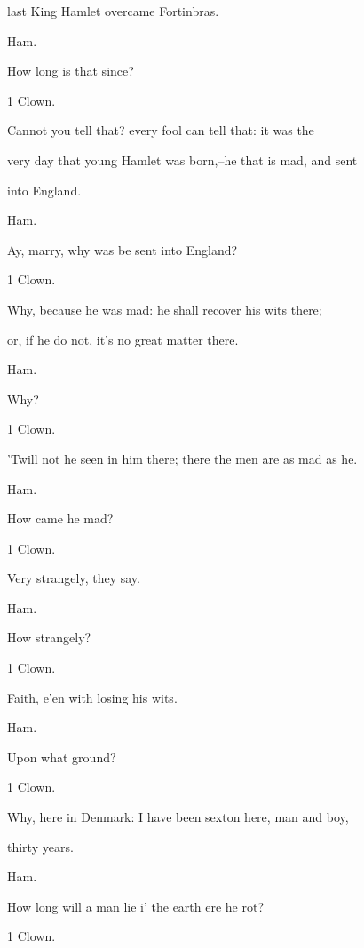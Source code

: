 \documentclass[12pt]{book}
\begin{document}
last King Hamlet overcame Fortinbras.



Ham.

How long is that since?



1 Clown.

Cannot you tell that? every fool can tell that: it was the

very day that young Hamlet was born,--he that is mad, and sent

into England.



Ham.

Ay, marry, why was be sent into England?



1 Clown.

Why, because he was mad: he shall recover his wits there;

or, if he do not, it's no great matter there.



Ham.

Why?



1 Clown.

'Twill not he seen in him there; there the men are as mad as he.



Ham.

How came he mad?



1 Clown.

Very strangely, they say.



Ham.

How strangely?



1 Clown.

Faith, e'en with losing his wits.



Ham.

Upon what ground?



1 Clown.

Why, here in Denmark: I have been sexton here, man and boy,

thirty years.



Ham.

How long will a man lie i' the earth ere he rot?



1 Clown.
\end{document}

